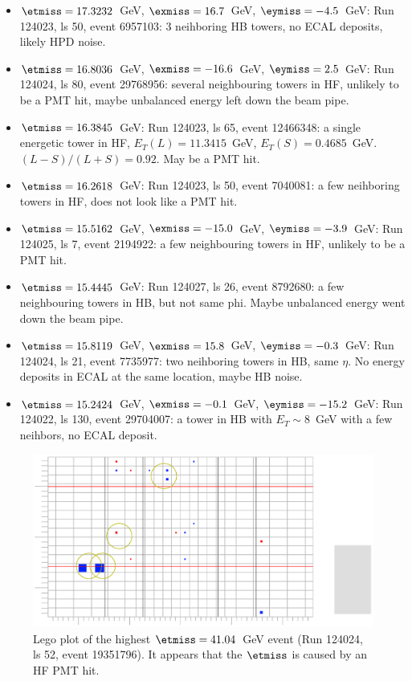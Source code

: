 \begin{itemize}
\item $\etmiss=17.3232$~GeV, $\exmiss=16.7$~GeV, $\eymiss=-4.5$~GeV: Run
  124023, ls 50, event 6957103: 3 neihboring HB towers, no ECAL
  deposits, likely HPD noise.

\item $\etmiss=16.8036$~GeV, $\exmiss=-16.6$~GeV, $\eymiss=2.5$~GeV: Run
  124024, ls 80, event 29768956: several neighbouring towers in HF,
  unlikely to be a PMT hit, maybe unbalanced energy left down the beam
  pipe.

\item $\etmiss=16.3845$~GeV: Run 124023, ls 65, event 12466348: a single
  energetic tower in HF, $E_{T}(L)= 11.3415$~GeV,
  $E_{T}(S)=0.4685$~GeV. $(L-S)/(L+S)=0.92$. May be a PMT hit.

\item $\etmiss=16.2618$~GeV: Run 124023, ls 50, event 7040081: a few
  neihboring towers in HF, does not look like a PMT hit.

\item $\etmiss=15.5162$~GeV, $\exmiss=-15.0$~GeV, $\eymiss=-3.9$~GeV:
  Run 124025, ls 7, event 2194922: a few neighbouring towers in HF,
  unlikely to be a PMT hit.

\item $\etmiss=15.4445$~GeV: Run 124027, ls 26, event 8792680: a few
  neighbouring towers in HB, but not same phi. Maybe unbalanced energy
  went down the beam pipe.

\item $\etmiss=15.8119$~GeV, $\exmiss=15.8$~GeV, $\eymiss=-0.3$~GeV: Run
  124024, ls 21, event 7735977: two neihboring towers in HB, same
  $\eta$.  No energy deposits in ECAL at the same location, maybe HB
  noise.

\item $\etmiss=15.2424$~GeV, $\exmiss=-0.1$~GeV, $\eymiss=-15.2$~GeV:
  Run 124022, ls 130, event 29704007: a tower in HB with $E_T\sim 8$~GeV
  with a few neihbors, no ECAL deposit.
\end{itemize}


\begin{figure}[h!]
  \includegraphics[width=12cm]{plots_DataVsMC_MB_900GeV/124024_19351796_MET41GeV.eps}
  \caption{Lego plot of the highest $\etmiss=41.04$~GeV event (Run 124024, ls 52, event 19351796). It appears
    that the $\etmiss$ is caused by an HF PMT hit.
    \label{fig:DataVsMC_MB_900_evd1}}
\end{figure}

